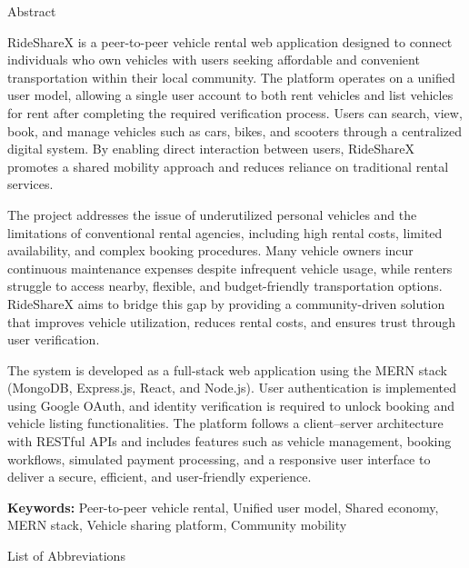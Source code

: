 \documentclass[12pt,a4paper]{report}
\renewenvironment{abstract}
{
    \clearpage
    {\fontseries{b}\fontsize{16}{24}\selectfont Abstract\par}
    \vspace{20pt}
    \addcontentsline{toc}{chapter}{Abstract}
    \noindent
}
{
    \par
}
\begin{document}
\begin{abstract}
RideShareX is a peer-to-peer vehicle rental web application designed to connect individuals who own vehicles with users seeking affordable and convenient transportation within their local community. The platform operates on a unified user model, allowing a single user account to both rent vehicles and list vehicles for rent after completing the required verification process. Users can search, view, book, and manage vehicles such as cars, bikes, and scooters through a centralized digital system. By enabling direct interaction between users, RideShareX promotes a shared mobility approach and reduces reliance on traditional rental services.

The project addresses the issue of underutilized personal vehicles and the limitations of conventional rental agencies, including high rental costs, limited availability, and complex booking procedures. Many vehicle owners incur continuous maintenance expenses despite infrequent vehicle usage, while renters struggle to access nearby, flexible, and budget-friendly transportation options. RideShareX aims to bridge this gap by providing a community-driven solution that improves vehicle utilization, reduces rental costs, and ensures trust through user verification.

The system is developed as a full-stack web application using the MERN stack (MongoDB, Express.js, React, and Node.js)\cite{mern}\cite{mongodb}\cite{node}\cite{express}\cite{react}. User authentication is implemented using Google OAuth\cite{oauth}, and identity verification is required to unlock booking and vehicle listing functionalities. The platform follows a client–server architecture with RESTful APIs and includes features such as vehicle management, booking workflows, simulated payment processing, and a responsive user interface to deliver a secure, efficient, and user-friendly experience.

\vspace{1.5em}
\noindent \textbf{Keywords:} Peer-to-peer vehicle rental, Unified user model, Shared economy, MERN stack, Vehicle sharing platform, Community mobility
\end{abstract}

    \newpage
    \tableofcontents
    \newpage
    \listoffigures
    \newpage
    \listoftables
	
	\newpage
    {\fontsize{16}{24}\selectfont List of Abbreviations\par}
    \vspace{20pt}
\end{document}
